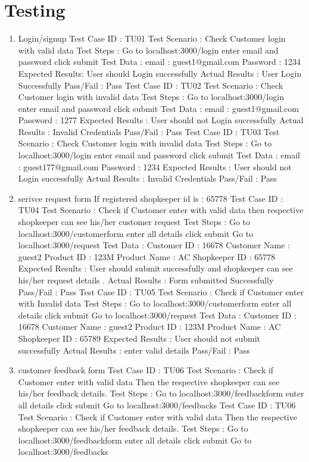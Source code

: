\documentclass[conference]{IEEEtran}
\begin{document}
\section{Testing}
\begin{enumerate}
\item Login/signup
Test Case ID : TU01
Test Scenario : Check Customer login with valid data
Test Steps : Go to localhost:3000/login
enter email and password
click submit
Test Data : email : guest1@gmail.com
Password : 1234
Expected Results: User should Login successfully
Actual Results : User Login Successfully
Pass/Fail : Pass
Test Case ID : TU02
Test Scenario : Check Customer login with invalid data
Test Steps : Go to localhost:3000/login
enter email and password
click submit
Test Data : email : guest1@gmail.com
Password : 1277
Expected Results : User should not Login successfully
Actual Results : Invalid Credentials
Pass/Fail : Pass
Test Case ID : TU03
Test Scenario : Check Customer login with invalid data
Test Steps : Go to localhost:3000/login
enter email and password
click submit
Test Data : email : guest177@gmail.com
Password : 1234
Expected Results : User should not Login successfully
Actual Results : Invalid Credentials
Pass/Fail : Pass

\item serivce request form
If registered shopkeeper id is : 65778
Test Case ID : TU04
Test Scenario : Check if Customer enter with valid data
then respective shopkeeper can see his/her customer
request
Test Steps : Go to localhost:3000/customerform
enter all details
click submit
Go to localhost:3000/request
Test Data : Customer ID : 16678
Customer Name : guest2
Product ID : 123M
Product Name : AC
Shopkeeper ID : 65778
Expected Results : User should submit successfully and
shopkeeper can see his/her request details .
Actual Results : Form submitted Successfully
Pass/Fail : Pass
Test Case ID : TU05
Test Scenario : Check if Customer enter with Invalid data
Test Steps : Go to localhost:3000/customerform
enter all details
click submit
Go to localhost:3000/request
Test Data : Customer ID : 16678
Customer Name : guest2
Product ID : 123M
Product Name : AC
Shopkeeper ID : 65789
Expected Results : User should not submit successfully
Actual Results : enter valid details
Pass/Fail : Pass


\item customer feedback form
Test Case ID : TU06
Test Scenario : Check if Customer enter with valid data
Then the respective shopkeeper can see his/her feedback
details.
Test Steps : Go to localhost:3000/feedbackform
enter all details
click submit
Go to localhost:3000/feedbacks
Test Case ID : TU06
Test Scenario : Check if Customer enter with valid data
Then the respective shopkeeper can see his/her feedback
details.
Test Steps : Go to localhost:3000/feedbackform
enter all details
click submit
Go to localhost:3000/feedbacks


\end{enumerate}
\end{document}
